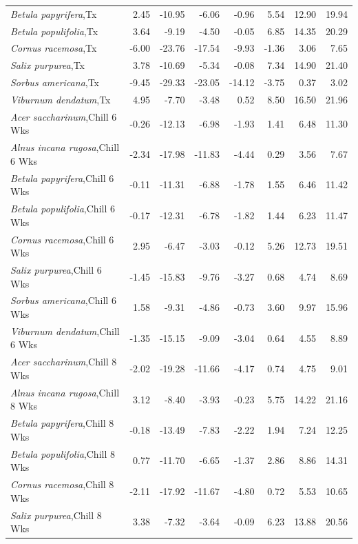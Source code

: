 \documentclass{article}\usepackage[]{graphicx}\usepackage[]{color}
\begin{document}
\begin{longtable}{lrrrrrrr}
  \textit{Betula papyrifera},Tx & 2.45 & -10.95 & -6.06 & -0.96 & 5.54 & 12.90 & 19.94 \\ 
  \textit{Betula populifolia},Tx & 3.64 & -9.19 & -4.50 & -0.05 & 6.85 & 14.35 & 20.29 \\ 
  \textit{Cornus racemosa},Tx & -6.00 & -23.76 & -17.54 & -9.93 & -1.36 & 3.06 & 7.65 \\ 
  \textit{Salix purpurea},Tx & 3.78 & -10.69 & -5.34 & -0.08 & 7.34 & 14.90 & 21.40 \\ 
  \textit{Sorbus americana},Tx & -9.45 & -29.33 & -23.05 & -14.12 & -3.75 & 0.37 & 3.02 \\ 
  \textit{Viburnum dendatum},Tx & 4.95 & -7.70 & -3.48 & 0.52 & 8.50 & 16.50 & 21.96 \\ 
  \textit{Acer saccharinum},Chill 6 Wks & -0.26 & -12.13 & -6.98 & -1.93 & 1.41 & 6.48 & 11.30 \\ 
  \textit{Alnus incana rugosa},Chill 6 Wks & -2.34 & -17.98 & -11.83 & -4.44 & 0.29 & 3.56 & 7.67 \\ 
  \textit{Betula papyrifera},Chill 6 Wks & -0.11 & -11.31 & -6.88 & -1.78 & 1.55 & 6.46 & 11.42 \\ 
  \textit{Betula populifolia},Chill 6 Wks & -0.17 & -12.31 & -6.78 & -1.82 & 1.44 & 6.23 & 11.47 \\ 
  \textit{Cornus racemosa},Chill 6 Wks & 2.95 & -6.47 & -3.03 & -0.12 & 5.26 & 12.73 & 19.51 \\ 
  \textit{Salix purpurea},Chill 6 Wks & -1.45 & -15.83 & -9.76 & -3.27 & 0.68 & 4.74 & 8.69 \\ 
  \textit{Sorbus americana},Chill 6 Wks & 1.58 & -9.31 & -4.86 & -0.73 & 3.60 & 9.97 & 15.96 \\ 
  \textit{Viburnum dendatum},Chill 6 Wks & -1.35 & -15.15 & -9.09 & -3.04 & 0.64 & 4.55 & 8.89 \\ 
  \textit{Acer saccharinum},Chill 8 Wks & -2.02 & -19.28 & -11.66 & -4.17 & 0.74 & 4.75 & 9.01 \\ 
  \textit{Alnus incana rugosa},Chill 8 Wks & 3.12 & -8.40 & -3.93 & -0.23 & 5.75 & 14.22 & 21.16 \\ 
  \textit{Betula papyrifera},Chill 8 Wks & -0.18 & -13.49 & -7.83 & -2.22 & 1.94 & 7.24 & 12.25 \\ 
  \textit{Betula populifolia},Chill 8 Wks & 0.77 & -11.70 & -6.65 & -1.37 & 2.86 & 8.86 & 14.31 \\ 
  \textit{Cornus racemosa},Chill 8 Wks & -2.11 & -17.92 & -11.67 & -4.80 & 0.72 & 5.53 & 10.65 \\ 
  \textit{Salix purpurea},Chill 8 Wks & 3.38 & -7.32 & -3.64 & -0.09 & 6.23 & 13.88 & 20.56 \\ 

\end{longtable}
\end{document}
